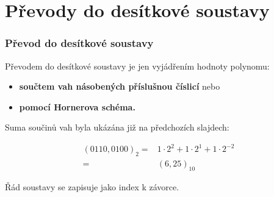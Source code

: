 \section{\texorpdfstring{Převody do desítkové soustavy}{Prevody do desitkove soustavy}}

\begin{frame}
    \frametitle{Převod do desítkové soustavy}
    
		\begin{minipage}[t][0.4\textheight][t]{\textwidth}
      Převodem do desítkové soustavy je jen vyjádřením hodnoty polynomu: \\
    
      \begin{itemize}
        \item \textbf{součtem vah násobených příslušnou číslicí} nebo
        \item \textbf{pomocí Hornerova schéma.}
      \end{itemize}
		\end{minipage}
		
		\begin{minipage}[t][0.5\textheight][t]{\textwidth}
      Suma součinů vah byla ukázána již na předchozích slajdech:

      \small
			\boldmath
			\begin{align*}
      (0110,0100)_2 =& 1 \cdot 2^2 + 1 \cdot 2^1 + 1 \cdot 2^{-2} \\
				=& (6,25)_{10}
			\end{align*}
      
      \normalsize
      Řád soustavy se zapisuje jako index k závorce.
		\end{minipage}
		
	\end{frame}
  
